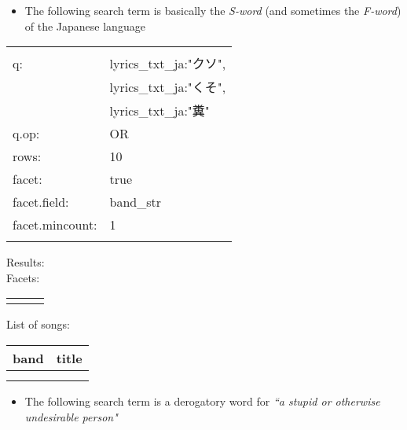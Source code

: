 \begin{itemize}
	\item The following search term is basically the \emph{S-word} (and sometimes the \emph{F-word}) of the Japanese language
\end{itemize}


\begin{tabular}{|l|l|}
	\hline
	& \\
	q: & lyrics\_txt\_ja:"クソ", \\
	& lyrics\_txt\_ja:"くそ", \\
	& lyrics\_txt\_ja:"糞"     \\
	q.op: & OR \\
	rows: & 10 \\
	facet: & true \\
	facet.field: & band\_str \\
	facet.mincount: & 1 \\
	& \\
	\hline
\end{tabular}

\bigskip
Results: \\



Facets:
\begin{longtable}{|l l|r|}
	\hline
	& & \\
	\endhead
	
	\hline
	\endfoot
	
	
	& & \\
	
\end{longtable}


List of songs:

\begin{longtable}{|l l|p{6cm}|}
	\hline
	\multicolumn{2}{|c|}{band} & 
	\multicolumn{1}{|c|}{title}
	\\
	\hline
	& & \\
	\endhead
	
	
	
	
	& & \\
	\hline
\end{longtable}


\bigskip
\bigskip
\bigskip


\begin{itemize}
	\item The following search term is a derogatory word for \emph{``a stupid or otherwise undesirable person"}
\end{itemize}




